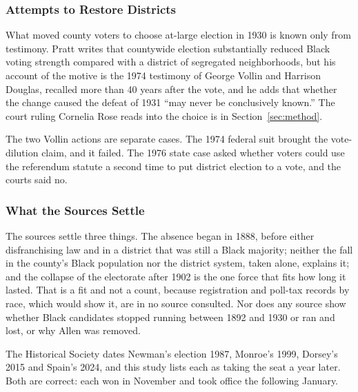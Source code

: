 \subsubsection{Attempts to Restore Districts}

What moved county voters to choose at-large election in 1930 is known only from
testimony. Pratt writes that countywide election substantially reduced Black
voting strength compared with a district of segregated neighborhoods, but his
account of the motive is the 1974 testimony of George Vollin and Harrison
Douglas, recalled more than 40 years after the vote, and he adds that whether
the change caused the defeat of 1931 ``may never be conclusively
known.''\autocite[22]{pratt1995} The court ruling Cornelia Rose reads into the
choice is in Section~\ref{sec:method}.


The two Vollin actions are separate cases. The 1974 federal suit brought the
vote-dilution claim, and it failed. The 1976 state case asked whether voters
could use the referendum statute a second time to put district election to a
vote, and the courts said no.

\subsubsection{What the Sources Settle}

The sources settle three things. The absence began in 1888, before either
disfranchising law and in a district that was still a Black majority; neither
the fall in the county's Black population nor the district system, taken alone,
explains it; and the collapse of the electorate after 1902 is the one force
that fits how long it lasted. That is a fit and not a count, because
registration and poll-tax records by race, which would show it, are in no source
consulted. Nor does any source show whether Black candidates stopped running
between 1892 and 1930 or ran and lost, or why Allen was removed.

The Historical Society dates Newman's election 1987, Monroe's 1999, Dorsey's
2015 and Spain's 2024, and this study lists each as taking the seat a year later. Both
are correct: each won in November and took office the following January.

